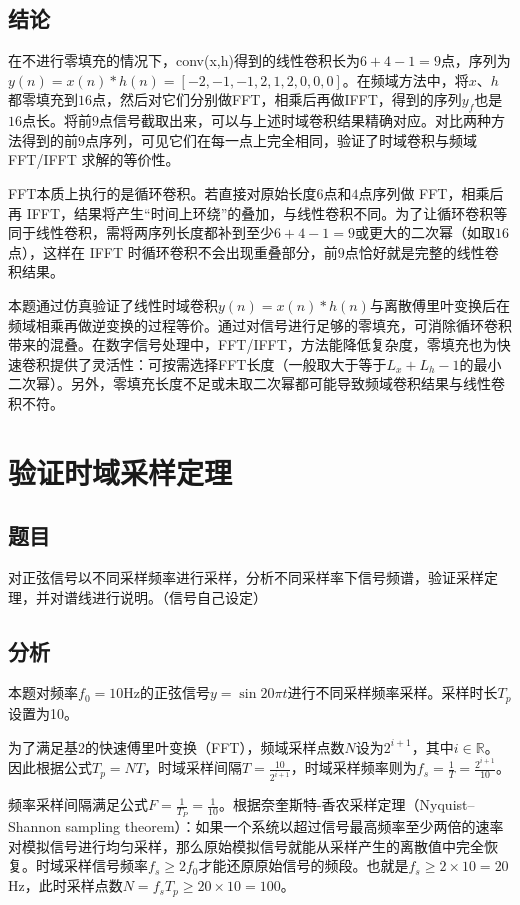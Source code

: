 \documentclass{ctexart}
\begin{document}
		\subsection{结论}
			在不进行零填充的情况下，conv(x,h)得到的线性卷积长为$6+4−1=9$点，序列为$y(n)=x(n)*h(n)=[-2,-1,-1,2,1,2,0,0,0]$。在频域方法中，将$x$、$h$都零填充到$16$点，然后对它们分别做FFT，相乘后再做IFFT，得到的序列$y_f$也是$16$点长。将前$9$点信号截取出来，可以与上述时域卷积结果精确对应。对比两种方法得到的前$9$点序列，可见它们在每一点上完全相同，验证了时域卷积与频域 FFT/IFFT 求解的等价性。\par
			FFT本质上执行的是循环卷积。若直接对原始长度$6$点和$4$点序列做 FFT，相乘后再 IFFT，结果将产生“时间上环绕”的叠加，与线性卷积不同。为了让循环卷积等同于线性卷积，需将两序列长度都补到至少$6+4−1=9$或更大的二次幂（如取$16$点），这样在 IFFT 时循环卷积不会出现重叠部分，前$9$点恰好就是完整的线性卷积结果。\par
			本题通过仿真验证了线性时域卷积$y(n)=x(n)*h(n)$与离散傅里叶变换后在频域相乘再做逆变换的过程等价。通过对信号进行足够的零填充，可消除循环卷积带来的混叠。在数字信号处理中，FFT/IFFT，方法能降低复杂度，零填充也为快速卷积提供了灵活性：可按需选择FFT长度（一般取大于等于$L_x+L_h-1$的最小二次幂）。另外，零填充长度不足或未取二次幂都可能导致频域卷积结果与线性卷积不符。
			
	\newpage
	\section{验证时域采样定理}
		\subsection{题目}
			对正弦信号以不同采样频率进行采样，分析不同采样率下信号频谱，验证采样定理，并对谱线进行说明。（信号自己设定）
		\subsection{分析}
			本题对频率$f_0=10$Hz的正弦信号$y=\sin20\pi t$进行不同采样频率采样。采样时长$T_p$设置为10。\par
			为了满足基2的快速傅里叶变换（FFT），频域采样点数$N$设为$2^{i+1}$，其中$i\in\mathbb{R}$。因此根据公式$T_p=NT$，时域采样间隔$T=\frac{10}{2^{i+1}}$，时域采样频率则为$f_s=\frac{1}{T}=\frac{2^{i+1}}{10}$。\par
			频率采样间隔满足公式$F=\frac{1}{T_P}=\frac{1}{10}$。根据奈奎斯特-香农采样定理（Nyquist–Shannon sampling theorem）：如果一个系统以超过信号最高频率至少两倍的速率对模拟信号进行均匀采样，那么原始模拟信号就能从采样产生的离散值中完全恢复。时域采样信号频率$f_s\geq2f_0$才能还原原始信号的频段。也就是$f_s\geq2\times10=20$Hz，此时采样点数$N=f_sT_p\geq20\times10=100$。
\end{document}
